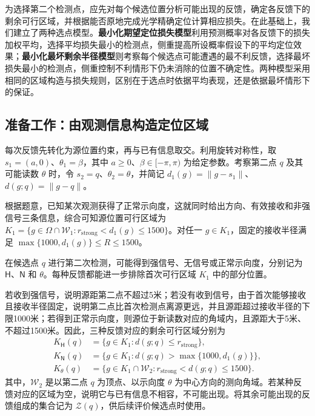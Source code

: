 \documentclass[UTF8,a4paper,zihao=-4,fontset=none]{ctexart}
\begin{document}
为选择第二个检测点，应先对每个候选位置分析可能出现的反馈，确定各反馈下的剩余可行区域，并根据能否原地完成光学精确定位计算相应损失。在此基础上，我们建立了两种选点模型。\textbf{最小化期望定位损失模型}利用预测概率对各反馈下的损失加权平均，选择平均损失最小的检测点，侧重提高所设概率假设下的平均定位效果；\textbf{最小化最坏剩余半径模型}则考察每个候选点可能遭遇的最不利反馈，选择最坏损失最小的检测点，侧重控制不利情形下仍未消除的位置不确定性。两种模型采用相同的区域构造与损失规则，区别在于选点时依据平均表现，还是依据最坏情形下的保证。

\subsection{准备工作：由观测信息构造定位区域}

每次反馈先转化为源位置约束，再与已有信息取交。利用旋转对称性，取 \(s_1=(a,0)\)、\(\theta_1=\beta\)，其中 \(a\ge0\)、\(\beta\in[-\pi,\pi)\) 为给定参数。考察第二点 \(q\) 及其可能读数 \(\theta\) 时，令 \(s_2=q\)、\(\theta_2=\theta\)，并简记 \(d_1(g)=\|g-s_1\|\)、\(d(g;q)=\|g-q\|\)。

根据题意，已知某次观测获得了正常示向度，这就同时给出方向、有效接收和非强信号三条信息，综合可知源位置可行区域为 \(K_1=\{g\in\Omega\cap\mathcal W_1:r_{\mathrm{strong}}<d_1(g)\le1500\}\)。对任一 \(g\in K_1\)，固定的接收半径满足 \(\max\{1000,d_1(g)\}\le R\le1500\)。

在候选点 \(q\) 进行第二次检测，可能得到强信号、无信号或正常示向度，分别记为 \(\mathsf H\)、\(\mathsf N\) 和 \(\theta\)。每种反馈都能进一步排除首次可行区域 \(K_1\) 中的部分位置。

若收到强信号，说明源距第二点不超过5米；若没有收到信号，由于首次能够接收且接收半径固定，说明第二点比首次检测点离源更远，并且源距超过接收半径的下限1000米；若得到正常示向度，则源位于新读数对应的角域内，且源距大于5米、不超过1500米。因此，三种反馈对应的剩余可行区域分别为
\begin{equation}
\begin{aligned}
K_{\mathsf H}(q)&=\{g\in K_1:d(g;q)\le r_{\mathrm{strong}}\},\\
K_{\mathsf N}(q)&=\{g\in K_1:d(g;q)>\max\{1000,d_1(g)\}\},\\
K_\theta(q)&=\{g\in K_1\cap\mathcal W_2:r_{\mathrm{strong}}<d(g;q)\le1500\}.
\end{aligned}
\label{eq:q2-pair-regions}
\end{equation}
其中，\(\mathcal W_2\) 是以第二点 \(q\) 为顶点、以示向度 \(\theta\) 为中心方向的测向角域。若某种反馈对应的区域为空，说明它与已有信息不相容，不可能出现。将其余可能出现的反馈组成的集合记为 \(\mathcal Z(q)\)，供后续评价候选点时使用。
\end{document}

